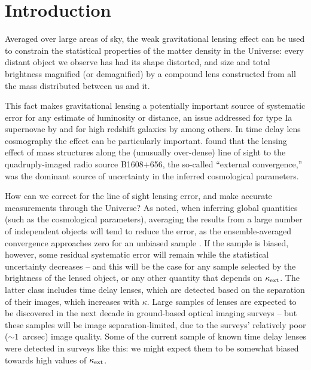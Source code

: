 \documentclass[useAMS,usenatbib]{mn2e}
\begin{document}
\setcounter{footnote}{1}


\section{Introduction}

Averaged over large areas of sky, the weak gravitational lensing effect can be
used to constrain the statistical properties of the matter density in the
Universe: every distant object we observe has had its shape distorted, and size
and total brightness magnified (or demagnified) by a compound lens constructed
from all the mass distributed between us and it.

This fact makes gravitational lensing a potentially important source of
systematic error for any estimate of luminosity or distance, an issue addressed
for \eg type Ia supernovae by \citet[][]{Holz+Wald,Linder+Holz} and for high
redshift galaxies by \citet{Loeb} among others. In time delay lens cosmography
the effect can be particularly important. \citet{Suyu2010} found that  the
lensing effect of mass structures along the (unusually over-dense)  line of
sight to the quadruply-imaged radio source B1608$+$656, the so-called ``external
convergence,'' was the dominant source of uncertainty in the inferred
cosmological parameters. 

How can we correct for the line of sight lensing error, and make accurate
measurements through the Universe? As \citeauthor{LH} noted, when inferring
global quantities (such as the cosmological parameters), averaging the results
from a large number of independent objects will tend to reduce the error, as the
ensemble-averaged convergence approaches zero for an unbiased sample
\citep{xxx}. If the sample is biased, however, some residual systematic error
will remain while the statistical uncertainty decreases -- and this will be the
case for any sample selected by the brightness of the lensed object, or any
other quantity that depends on $\kappa_{\rm ext}$. The latter class includes time delay
lenses, which are detected based on the separation of their images, which
increases with $\kappa$. Large samples of lenses are expected to be discovered
in the next decade in ground-based optical imaging surveys
\citep{Oguri+Marshll2010} -- but these samples will be image separation-limited,
due to the surveys' relatively poor ($\sim 1$~arcsec) image quality. Some of the
current sample of known time delay lenses were detected in surveys like this: we
might expect them to be somewhat biased towards high values of $\kappa_{\rm ext}$.
\end{document}
